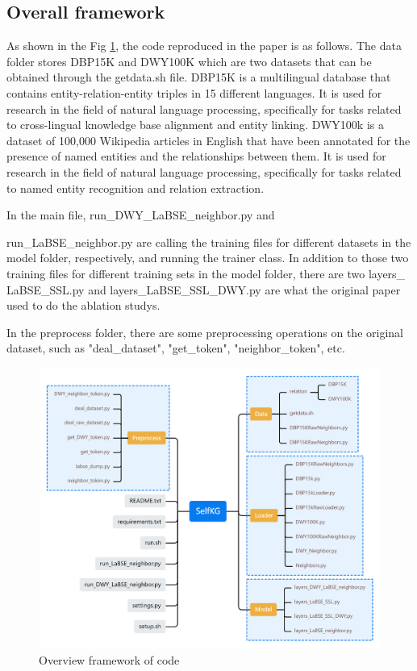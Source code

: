 \documentclass[sigconf]{acmart}
\begin{document}
{\subsection{Overall framework}
As shown in the Fig \ref{code overview}, the code reproduced in the paper is as follows. The data folder stores DBP15K and DWY100K which are two datasets that can be obtained through the getdata.sh file. DBP15K is a multilingual database that contains entity-relation-entity triples in 15 different languages. It is used for research in the field of natural language processing, specifically for tasks related to cross-lingual knowledge base alignment and entity linking. DWY100k is a dataset of 100,000 Wikipedia articles in English that have been annotated for the presence of named entities and the relationships between them. It is used for research in the field of natural language processing, specifically for tasks related to named entity recognition and relation extraction.

In the main file, run\_DWY\_LaBSE\_neighbor.py and

\noindent run\_LaBSE\_neighbor.py are calling the training files for different datasets in the model folder, respectively, and running the trainer class. In addition to those two training files for different training sets in the model folder, there are two layers\_ LaBSE\_SSL.py and layers\_LaBSE\_SSL\_DWY.py are what the original paper used to do the ablation studys.

In the preprocess folder, there are some preprocessing operations on the original dataset, such as "deal\_dataset", "get\_token", "neighbor\_token", etc.
\begin{figure}[H]
    \centering
    \includegraphics[height=0.88\linewidth]{figure/SelfKG.png}
    \caption{Overview framework of code}
    \label{code overview}
\end{figure}
}
\end{document}
